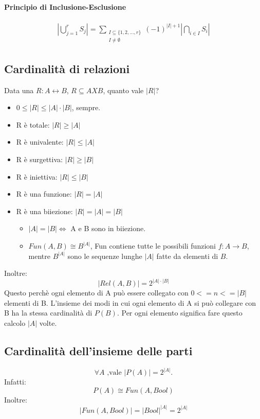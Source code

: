 \documentclass[a4paper,12pt]{article}
\begin{document}
\paragraph{Principio di Inclusione-Esclusione}
\begin{align*}
    |\bigcup_{j=1}^r S_j| = \sum_{\substack{I \subseteq \{1,2,\dots,r\} \\ I \ne \emptyset}} (-1)^{|I| + 1} |\bigcap_{i \in I} S_i|
\end{align*}

\subsection{Cardinalità di relazioni}
Data una $R:A \leftrightarrow B$, $R \subseteq AXB$, quanto vale $|R|$?
\begin{itemize}
    \item $0 \leq |R| \leq |A| \cdot |B|$, sempre.
    \item R è totale: $|R| \geq |A|$
    \item R è univalente: $|R| \leq |A|$
    \item R è surgettiva: $|R| \geq |B|$
    \item R è iniettiva: $|R| \leq |B|$
    \item R è una funzione: $|R| = |A|$
    \item R è una biiezione: $|R| = |A| = |B|$
    \begin{itemize}
        \item $|A| = |B| \Longleftrightarrow $ A e B sono in biiezione.
        \item $Fun(A,B) \cong B^{|A|}$, Fun contiene tutte le possibili funzioni $f:A \rightarrow B$, mentre $B^{|A|}$ sono le sequenze lunghe $|A|$ fatte da elementi di $B$.
    \end{itemize}
\end{itemize}
Inoltre:
\[
|Rel(A,B)| = 2^{|A| \cdot |B|}
\]
Questo perchè ogni elemento di A può essere collegato con $0 <= n <= |B|$ elementi di B.
L'insieme dei modi in cui ogni elemento di A si può collegare con B ha la stessa cardinalità di $P(B)$.
Per ogni elemento significa fare questo calcolo $|A|$ volte.
\subsection{Cardinalità dell'insieme delle parti}
\[
\forall A \text{ ,vale } |P(A)| = 2^{|A|}.
\]
Infatti:
\[
P(A) \cong Fun(A,Bool)
\]
Inoltre:
\[
|Fun(A,Bool)| = |Bool|^{|A|} = 2^{|A|}
\]
\end{document}
